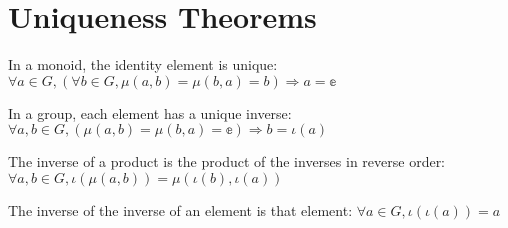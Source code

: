 \section{Uniqueness Theorems}

\begin{theorem}
    \label{theorem : identity_uniqueness}
    \leanok
    In a monoid, the identity element is unique:
    $\forall a \in G, (\forall b \in G, \mu(a, b) = \mu(b, a) = b) \Rightarrow a = \mathbb{e}$
  \end{theorem}

\begin{theorem}
    \label{theorem : inverse_uniqueness}
    \leanok
    In a group, each element has a unique inverse:
    $\forall a, b \in G, (\mu(a, b) = \mu(b, a) = \mathbb{e}) \Rightarrow b = \iota(a)$
  \end{theorem}

\begin{theorem}
  \label{theorem : shoes_and_socks}
  \leanok
  The inverse of a product is the product of the inverses in reverse order:
  $\forall a, b \in G, \iota(\mu(a, b)) = \mu(\iota(b), \iota(a))$
\end{theorem}

\begin{theorem}
  \label{theorem : inv_inv}
  \leanok
  The inverse of the inverse of an element is that element:
  $\forall a \in G, \iota(\iota(a)) = a$
\end{theorem}
